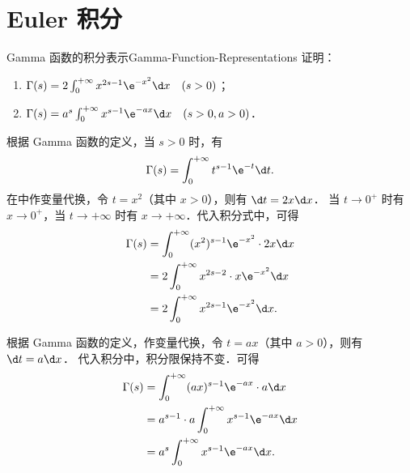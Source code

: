 \section{Euler 积分}

\begin{problem}{Gamma 函数的积分表示}{Gamma-Function-Representations}
    证明：
    \begin{enumerate}
        \item $\Gamma(s) = 2 \int_{0}^{+\infty} x^{2s-1} \e^{-x^2} \d x \quad (s > 0)$；
        \item $\Gamma(s) = a^s \int_{0}^{+\infty} x^{s-1} \e^{-ax} \d x \quad (s > 0, a > 0)$．
    \end{enumerate}
\end{problem}

\begin{myproof}

    根据 Gamma 函数的定义，当 $s > 0$ 时，有
    \begin{equation}\label{eq:gamma-def}
        \Gamma(s) = \int_{0}^{+\infty} t^{s-1} \e^{-t} \d t.
    \end{equation}
    在中作变量代换，令 $t = x^2$（其中 $x > 0$），则有 $\d t = 2x \d x$．
    当 $t \to 0^+$ 时有 $x \to 0^+$，当 $t \to +\infty$ 时有 $x \to +\infty$．代入积分式中，可得
    \begin{equation}\label{eq:gamma-proof-1}
        \begin{aligned}
            \Gamma(s) & = \int_{0}^{+\infty} (x^2)^{s-1} \e^{-x^2} \cdot 2x \d x \\
                      & = 2 \int_{0}^{+\infty} x^{2s-2} \cdot x \e^{-x^2} \d x   \\
                      & = 2 \int_{0}^{+\infty} x^{2s-1} \e^{-x^2} \d x.
        \end{aligned}
    \end{equation}


    根据 Gamma 函数的定义，作变量代换，令 $t = ax$（其中 $a > 0$），则有 $\d t = a \d x$．
    代入积分中，积分限保持不变．可得
    \begin{equation}\label{eq:gamma-proof-2}
        \begin{aligned}
            \Gamma(s) & = \int_{0}^{+\infty} (ax)^{s-1} \e^{-ax} \cdot a \d x      \\
                      & = a^{s-1} \cdot a \int_{0}^{+\infty} x^{s-1} \e^{-ax} \d x \\
                      & = a^s \int_{0}^{+\infty} x^{s-1} \e^{-ax} \d x.
        \end{aligned}
    \end{equation}
\end{myproof}

